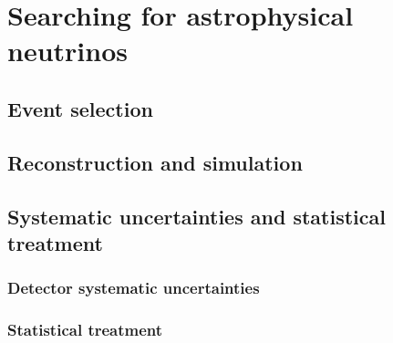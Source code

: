 \chapter{Searching for astrophysical neutrinos}

\section{Event selection\label{sec:selection}}
\begingroup
\graphicspath{{results/HESE_Final_Paper/}}

\endgroup

\section{Reconstruction and simulation}
\begingroup
\graphicspath{{results/HESE_Final_Paper/}}

\endgroup

\section{Systematic uncertainties and statistical treatment\label{sec:uncertainties}}
\subsection{Detector systematic uncertainties\label{sec:detector_systematics}}
\begingroup
\graphicspath{{results/HESE_Final_Paper/}}

\endgroup

\subsection{Statistical treatment\label{sec:statistics}}
\begingroup
\graphicspath{{results/HESE_Final_Paper/}}

\endgroup
